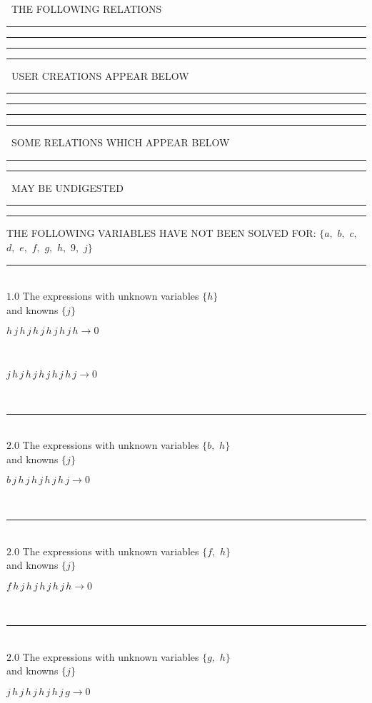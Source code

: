 \documentclass[rep10,leqno]{report}
\begin{document}
\ THE FOLLOWING RELATIONS\ 
\rule[2pt]{1.923in}{4pt}\hfil\break
\rule[2pt]{6in}{4pt}\hfil\break
\rule[2pt]{6in}{1pt}\hfil\break
\rule[2.5pt]{1.701in}{1pt}
\ USER CREATIONS APPEAR BELOW\ 
\rule[2.5pt]{1.701in}{1pt}\hfil\break
\rule[2pt]{6in}{1pt}\hfil\break
\rule[2pt]{6in}{4pt}\hfil\break
\rule[2pt]{1.45in}{4pt}
\ SOME RELATIONS WHICH APPEAR BELOW\ 
\rule[2pt]{1.45in}{4pt}\hfil\break
\rule[2pt]{2.18in}{4pt}
\ MAY BE UNDIGESTED\ 
\rule[2pt]{2.18in}{4pt}\hfil\break
\rule[2pt]{6in}{4pt}\hfil\break
THE FOLLOWING VARIABLES HAVE NOT BEEN SOLVED FOR:\hfil\break
$\{a,
$ $
b,
$ $
c,
$ $
d,
$ $
e,
$ $
f,
$ $
g,
$ $
h,
$ $
9,
$ $
j\}$
\smallskip\\
\rule[3pt]{6in}{.7pt}\\
$1.0$  The expressions with unknown variables $\{h\}$\\
and knowns $\{j\}$\smallskip\\
\begin{minipage}{6in}
$
h\,
 j\,
 h\,
 j\,
 h\,
 j\,
 h\,
 j\,
 h\,
 j\,
 h\rightarrow 0
$
\end{minipage}\medskip \\
\begin{minipage}{6in}
$
j\,
 h\,
 j\,
 h\,
 j\,
 h\,
 j\,
 h\,
 j\,
 h\,
 j\rightarrow 0
$
\end{minipage}\\
\rule[3pt]{6in}{.7pt}\\
$2.0$  The expressions with unknown variables $\{b,
$ $
h\}$\\
and knowns $\{j\}$\smallskip\\
\begin{minipage}{6in}
$
b\,
 j\,
 h\,
 j\,
 h\,
 j\,
 h\,
 j\,
 h\,
 j\rightarrow 0
$
\end{minipage}\\
\rule[3pt]{6in}{.7pt}\\
$2.0$  The expressions with unknown variables $\{f,
$ $
h\}$\\
and knowns $\{j\}$\smallskip\\
\begin{minipage}{6in}
$
f\,
 h\,
 j\,
 h\,
 j\,
 h\,
 j\,
 h\,
 j\,
 h\rightarrow 0
$
\end{minipage}\\
\rule[3pt]{6in}{.7pt}\\
$2.0$  The expressions with unknown variables $\{g,
$ $
h\}$\\
and knowns $\{j\}$\smallskip\\
\begin{minipage}{6in}
$
j\,
 h\,
 j\,
 h\,
 j\,
 h\,
 j\,
 h\,
 j\,
 g\rightarrow 0
$
\end{minipage}\\
\end{document}
